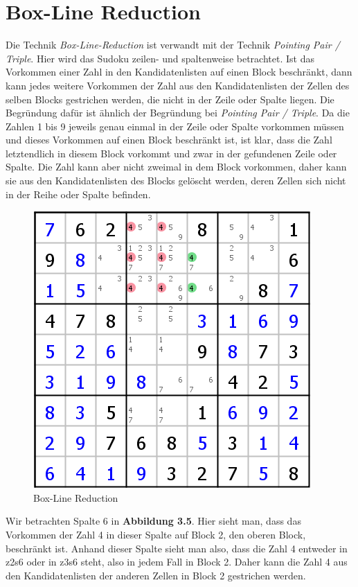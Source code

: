 \newpage
\section{Box-Line Reduction}
Die Technik \textit{Box-Line-Reduction} ist verwandt mit der Technik \textit{Pointing Pair / Triple}. Hier wird das Sudoku zeilen- und spaltenweise betrachtet. Ist das Vorkommen einer Zahl in den Kandidatenlisten auf einen Block beschränkt, dann kann jedes weitere Vorkommen der Zahl aus den Kandidatenlisten der Zellen des selben Blocks gestrichen werden, die nicht in der Zeile oder Spalte liegen. Die Begründung dafür ist ähnlich der Begründung bei \textit{Pointing Pair / Triple}. Da die Zahlen 1 bis 9 jeweils genau einmal in der Zeile oder Spalte vorkommen müssen und dieses Vorkommen auf einen Block beschränkt ist, ist klar, dass die Zahl letztendlich in diesem Block vorkommt und zwar in der gefundenen Zeile oder Spalte. Die Zahl kann aber nicht zweimal in dem Block vorkommen, daher kann sie aus den Kandidatenlisten des Blocks gelöscht werden, deren Zellen sich nicht in der Reihe oder Spalte befinden.

\begin{figure}[h]
\begin{center}
\includegraphics{./img/box_line_reduction.png}
\caption{Box-Line Reduction}
\end{center}
\end{figure}

Wir betrachten Spalte 6 in \textbf{Abbildung 3.5}. Hier sieht man, dass das Vorkommen der Zahl 4 in dieser Spalte auf Block 2, den oberen Block, beschränkt ist. Anhand dieser Spalte sieht man also, dass die Zahl 4 entweder in z2s6 oder in z3s6 steht, also in jedem Fall in Block 2. Daher kann die Zahl 4 aus den Kandidatenlisten der anderen Zellen in Block 2 gestrichen werden.
